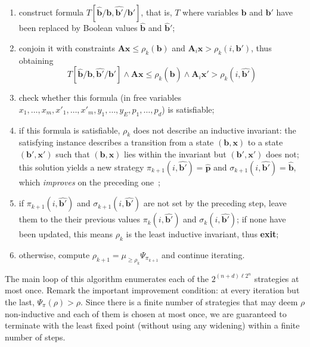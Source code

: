 \documentclass{llncs}
\newcommand{\pponly}[1]{}
\newcommand{\instance}[1]{\hat{#1}}
\newcommand{\mat}[1]{{\boldsymbol #1}}
\renewcommand{\vec}[1]{{\boldsymbol #1}}
\begin{document}
\begin{enumerate}
\item construct formula
  $T[\instance{\vec{b}}/\vec{b},\instance{\vec{b}'}/\vec{b}']$, that
  is, $T$ where variables $\vec{b}$ and $\vec{b}'$ have been replaced
  by Boolean values $\instance{\vec{b}}$ and $\instance{\vec{b}}'$;
\item conjoin it with constraints $\mat{A}\vec{x} \leq
  \rho_k(\vec{b})$ and $\mat{A}_i\vec{x} > \rho_k(i,\vec{b}')$,
thus obtaining\pponly{\\[-4ex]}
\begin{equation}\label{for:invariant_violation}
  T[\instance{\vec{b}}/\vec{b},\instance{\vec{b}'}/\vec{b}'] \land \mat{A}\vec{x} \leq \rho_k(\instance{\vec{b}}) \land \mat{A}_i\vec{x}' > \rho_k(i,\instance{\vec{b}'})
\end{equation}
\item check whether this formula (in free variables
  $x_1,\dots,x_m,\allowbreak x'_1,\dots,x'_m,\allowbreak
  y_1,\dots,y_E, \allowbreak p_1,\dots,p_d$) is satisfiable;
\item if this formula is satisfiable, $\rho_k$ does not describe an
  inductive invariant: the satisfying instance describes a transition
  from a state $(\vec{b},\vec{x})$ to a state $(\vec{b}', \vec{x}')$
  such that $(\vec{b},\vec{x})$ lies within the invariant but
  $(\vec{b}',\vec{x}')$ does not; this solution yields a new strategy
  $\pi_{k+1}(i,\instance{\vec{b}'})=\instance{\vec{p}}$ and
  $\sigma_{k+1}(i,\instance{\vec{b}'})=\instance{\vec{b}}$, which
  \emph{improves} on the preceding
  one~\cite[\S6.3]{Gawlitza_Monniaux_LMCS12};
\item if $\pi_{k+1} (i,\instance{\vec{b}'})$ and
      $\sigma_{k+1} (i,\instance{\vec{b}'})$ are not set by the preceding
      step, leave them to the their previous values $\pi_k(i,\instance{\vec{b}'})$ and $\sigma_k(i,\instance{\vec{b}'})$; if none have been
      updated, this means $\rho_k$ is the least inductive invariant, thus
      \textbf{exit}; 
\item otherwise, compute $\rho_{k+1} = \mu_{\geq \rho_k} \Psi_{\pi_{k+1}}$ and continue iterating.
\end{enumerate}
The main loop of this algorithm enumerates each of the $2^{(n+d)\ell 2^n}$
strategies at most once.  Remark the important improvement condition:
at every iteration but the last, $\Psi_\pi(\rho) > \rho$. Since there
is a finite number of strategies that may deem $\rho$
non-inductive and each of them is chosen at most once, we are
guaranteed to terminate with the least fixed point (without using any
widening) within a finite number of steps.
\end{document}
